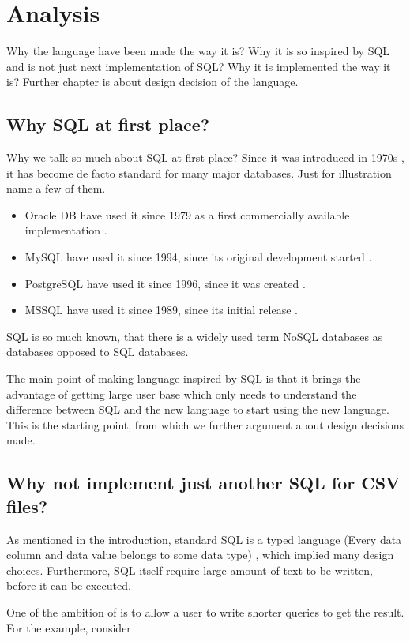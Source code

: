 \chapter{Analysis}
Why the language have been made the way it is? Why it is so inspired by SQL and is not just next implementation of SQL?
Why it is implemented the way it is?
Further chapter is about design decision of the language.


\section{Why SQL at first place?}
Why we talk so much about SQL at first place? Since it was introduced in 1970s \cite{enwiki-sql}, it has
become de facto standard for many major databases. Just for illustration name a few of them.
\begin{itemize}
    \item Oracle DB have used it since 1979 as a first commercially available implementation \cite{oracle-db-sql}. 
    \item MySQL have used it since 1994, since its original development started \cite{enwiki-mysql}.
    \item PostgreSQL have used it since 1996, since it was created \cite{postgres-birthday}. 
    \item MSSQL have used it since 1989, since its initial release \cite{enwiki-mssql}. 
\end{itemize}

SQL is so much known, that there is a widely used term NoSQL databases as databases opposed to SQL databases.

The main point of making language inspired by SQL is that it brings the advantage of getting large user base which only needs to understand the difference between SQL and the new language to start using the new language. This is the starting point, from which we further argument about design decisions made.


\section{Why not implement just another SQL for CSV files?}
As mentioned in the introduction, standard SQL is a typed language (Every data column and data value belongs to some data type) \cite{ISO9075-2023}, 
which implied many design choices. Furthermore, SQL itself require large amount of text to be written,
before it can be executed. 

One of the ambition of  is to allow a user to write shorter queries to get the result. For the example,
consider

